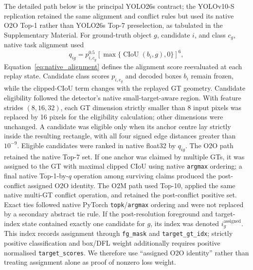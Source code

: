 The detailed path below is the principal YOLO26s contract; the YOLOv10-S replication retained the same alignment and conflict rules but used its native O2O Top-1 rather than YOLO26s Top-7 preselection, as tabulated in the Supplementary Material. For ground-truth object $g$, candidate $i$, and class $c_g$, native task alignment used
\begin{equation}
q_{ig}=p_{i,c_g}^{0.5}\left[\max\{\operatorname{CIoU}(b_i,g),0\}\right]^6,
\label{eq:native_alignment}
\end{equation}
Equation~\eqref{eq:native_alignment} defines the alignment score reevaluated at each replay state. Candidate class scores $p_{i,c_g}$ and decoded boxes $b_i$ remain frozen, while the clipped-CIoU term changes with the replayed GT geometry. Candidate eligibility followed the detector's native small-target-aware region. With feature strides $(8,16,32)$, each GT dimension strictly smaller than 8 input pixels was replaced by 16 pixels for the eligibility calculation; other dimensions were unchanged. A candidate was eligible only when its anchor centre lay strictly inside the resulting rectangle, with all four signed edge distances greater than $10^{-9}$. Eligible candidates were ranked in native float32 by $q_{ig}$. The O2O path retained the native Top-7 set. If one anchor was claimed by multiple GTs, it was assigned to the GT with maximal clipped CIoU using native \texttt{argmax} ordering; a final native Top-1-by-$q$ operation among surviving claims produced the post-conflict assigned O2O identity. The O2M path used Top-10, applied the same native multi-GT conflict operation, and retained the post-conflict positive set. Exact ties followed native PyTorch \texttt{topk}/\texttt{argmax} ordering and were not replaced by a secondary abstract tie rule. If the post-resolution foreground and target-index state contained exactly one candidate for $g$, its index was denoted $i_g^{\mathrm{assigned}}$. This index records assignment through \texttt{fg\_mask} and \texttt{target\_gt\_idx}; strictly positive classification and box/DFL weight additionally requires positive normalised \texttt{target\_scores}. We therefore use ``assigned O2O identity'' rather than treating assignment alone as proof of nonzero loss weight.

